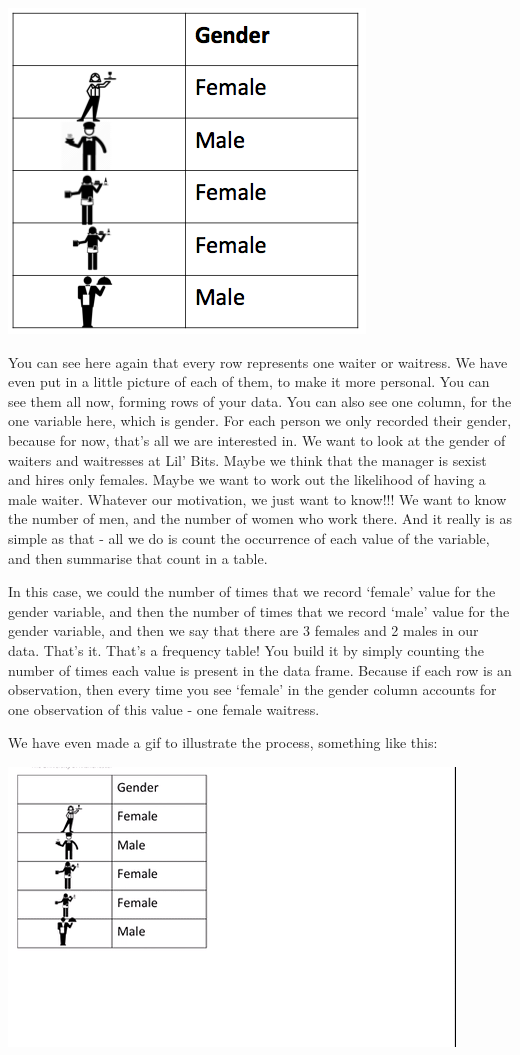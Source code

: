 \documentclass[
]{book}
\begin{document}
\includegraphics{imgs/waiter_heights.png}

You can see here again that every row represents one waiter or waitress. We have even put in a little picture of each of them, to make it more personal. You can see them all now, forming rows of your data. You can also see one column, for the one variable here, which is gender. For each person we only recorded their gender, because for now, that's all we are interested in. We want to look at the gender of waiters and waitresses at Lil' Bits. Maybe we think that the manager is sexist and hires only females. Maybe we want to work out the likelihood of having a male waiter. Whatever our motivation, we just want to know!!! We want to know the number of men, and the number of women who work there. And it really is as simple as that - all we do is count the occurrence of each value of the variable, and then summarise that count in a table.

In this case, we could the number of times that we record `female' value for the gender variable, and then the number of times that we record `male' value for the gender variable, and then we say that there are 3 females and 2 males in our data. That's it. That's a frequency table! You build it by simply counting the number of times each value is present in the data frame. Because if each row is an observation, then every time you see `female' in the gender column accounts for one observation of this value - one female waitress.

We have even made a gif to illustrate the process, something like this:

\includegraphics{imgs/freq_table_gif.gif}
\end{document}
